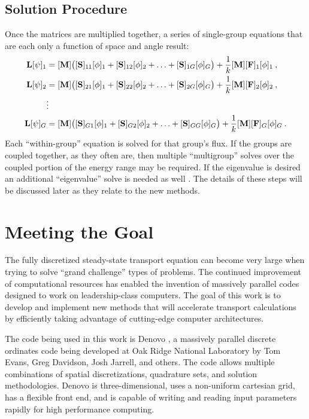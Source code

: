 \subsection{Solution Procedure}
Once the matrices are multiplied together, a series of single-group equations that are each only a function of space and angle result:
%
\begin{equation}
  \begin{aligned}
    \mathbf{L}[\psi]_1 &= [\mathbf{M}]\bigl([\mathbf{S}]_{11}[\phi]_1 + 
    [\mathbf{S}]_{12}[\phi]_2 + \ldots + [\mathbf{S}]_{1G}[\phi]_G\bigr) + 
    \frac{1}{k}[\mathbf{M}][\mathbf{F}]_{1}[\phi]_{1} \:, \\
    \mathbf{L}[\psi]_2 &= [\mathbf{M}]\bigl([\mathbf{S}]_{21}[\phi]_1 + 
    [\mathbf{S}]_{22}[\phi]_2 + \ldots + [\mathbf{S}]_{2G}[\phi]_G\bigr) + 
     \frac{1}{k}[\mathbf{M}][\mathbf{F}]_{2}[\phi]_{2} \:, \\
    &\vdots\\
    \mathbf{L}[\psi]_G &= [\mathbf{M}]\bigl([\mathbf{S}]_{G1}[\phi]_1 + 
    [\mathbf{S}]_{G2}[\phi]_2 + \ldots + [\mathbf{S}]_{GG}[\phi]_G\bigr) + 
     \frac{1}{k}[\mathbf{M}][\mathbf{F}]_{G}[\phi]_{G} \:.
  \end{aligned}
  \label{eq:group-equations}
\end{equation}
%
Each ``within-group'' equation is solved for that group's flux. If the groups are coupled together, as they often are, then multiple ``multigroup'' solves over the coupled portion of the energy range may be required. If the eigenvalue is desired an additional ``eigenvalue'' solve is needed as well \cite{Evans2009}. The details of these steps will be discussed later as they relate to the new methods.  


\section{Meeting the Goal}
The fully discretized steady-state transport equation can become very large when trying to solve ``grand challenge'' types of problems. The continued improvement of computational resources has enabled the invention of massively parallel codes designed to work on leadership-class computers. The goal of this work is to develop and implement new methods that will accelerate transport calculations by efficiently taking advantage of cutting-edge computer architectures. 

The code being used in this work is Denovo \cite{Evans2009}, a massively parallel discrete ordinates code being developed at Oak Ridge National Laboratory by Tom Evans, Greg Davidson, Josh Jarrell, and others. The code allows multiple combinations of spatial discretizations, quadrature sets, and solution methodologies. Denovo is three-dimensional, uses a non-uniform cartesian grid, has a flexible front end, and is capable of writing and reading input parameters rapidly for high performance computing. 

